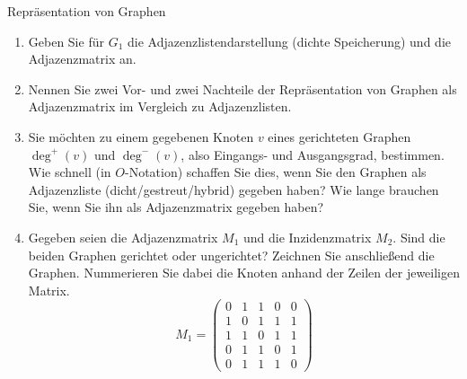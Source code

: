 \documentclass[11pt,a4paper]{article}
\begin{document}
\begin{aufgabe}{1}{Repräsentation von Graphen}
\begin{figure}[h!]
    \end{figure}
    \begin{enumerate}
        \item Geben Sie für $G_1$ die Adjazenzlistendarstellung (dichte Speicherung) und die Adjazenzmatrix an.
        \item Nennen Sie zwei Vor- und zwei Nachteile der Repräsentation von Graphen als Adjazenzmatrix im Vergleich zu Adjazenzlisten.
        \item Sie möchten zu einem gegebenen Knoten $v$ eines gerichteten Graphen $\operatorname{deg}^+(v)$ und $\operatorname{deg}^-(v)$, also Eingangs- und Ausgangsgrad, bestimmen.
        Wie schnell (in $O$-Notation) schaffen Sie dies, wenn Sie den Graphen als Adjazenzliste (dicht/gestreut/hybrid) gegeben haben?
        Wie lange brauchen Sie, wenn Sie ihn als Adjazenzmatrix gegeben haben?
        \item 
        Gegeben seien die Adjazenzmatrix $M_1$ und die Inzidenzmatrix $M_2$.
        Sind die beiden Graphen gerichtet oder ungerichtet?
        Zeichnen Sie anschließend die Graphen.
        Nummerieren Sie dabei die Knoten anhand der Zeilen der jeweiligen Matrix.
        \begin{equation*}
            M_1 = \begin{pmatrix}
                0 & 1 & 1 & 0 & 0 \\
                1 & 0 & 1 & 1 & 1 \\
                1 & 1 & 0 & 1 & 1 \\
                0 & 1 & 1 & 0 & 1 \\
                0 & 1 & 1 & 1 & 0 

\end{pmatrix}
\end{equation*}
\end{enumerate}
\end{aufgabe}
\end{document}
